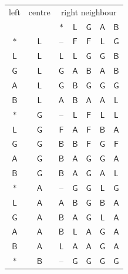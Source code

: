 \begin{table}[p]
\centering\small
\begin{tabular}{@{}cc|ccccc@{}}
\toprule
left & centre & \multicolumn{5}{c}{right neighbour}\\
 & & $\ast$ & $\mathsf{L}$ & $\mathsf{G}$ & $\mathsf{A}$ & $\mathsf{B}$\\
\midrule
$\ast$ & $\mathsf{L}$ & -- & $\mathsf{F}$ & $\mathsf{F}$ & $\mathsf{L}$ & $\mathsf{G}$\\
$\mathsf{L}$ & $\mathsf{L}$ & $\mathsf{L}$ & $\mathsf{L}$ & $\mathsf{G}$ & $\mathsf{G}$ & $\mathsf{B}$\\
$\mathsf{G}$ & $\mathsf{L}$ & $\mathsf{G}$ & $\mathsf{A}$ & $\mathsf{B}$ & $\mathsf{A}$ & $\mathsf{B}$\\
$\mathsf{A}$ & $\mathsf{L}$ & $\mathsf{G}$ & $\mathsf{B}$ & $\mathsf{G}$ & $\mathsf{G}$ & $\mathsf{G}$\\
$\mathsf{B}$ & $\mathsf{L}$ & $\mathsf{A}$ & $\mathsf{B}$ & $\mathsf{A}$ & $\mathsf{A}$ & $\mathsf{L}$\\
\midrule
$\ast$ & $\mathsf{G}$ & -- & $\mathsf{L}$ & $\mathsf{F}$ & $\mathsf{L}$ & $\mathsf{L}$\\
$\mathsf{L}$ & $\mathsf{G}$ & $\mathsf{F}$ & $\mathsf{A}$ & $\mathsf{F}$ & $\mathsf{B}$ & $\mathsf{A}$\\
$\mathsf{G}$ & $\mathsf{G}$ & $\mathsf{B}$ & $\mathsf{B}$ & $\mathsf{F}$ & $\mathsf{G}$ & $\mathsf{F}$\\
$\mathsf{A}$ & $\mathsf{G}$ & $\mathsf{B}$ & $\mathsf{A}$ & $\mathsf{G}$ & $\mathsf{G}$ & $\mathsf{A}$\\
$\mathsf{B}$ & $\mathsf{G}$ & $\mathsf{B}$ & $\mathsf{A}$ & $\mathsf{G}$ & $\mathsf{A}$ & $\mathsf{L}$\\
\midrule
$\ast$ & $\mathsf{A}$ & -- & $\mathsf{G}$ & $\mathsf{G}$ & $\mathsf{L}$ & $\mathsf{G}$\\
$\mathsf{L}$ & $\mathsf{A}$ & $\mathsf{A}$ & $\mathsf{B}$ & $\mathsf{G}$ & $\mathsf{B}$ & $\mathsf{A}$\\
$\mathsf{G}$ & $\mathsf{A}$ & $\mathsf{B}$ & $\mathsf{A}$ & $\mathsf{G}$ & $\mathsf{L}$ & $\mathsf{A}$\\
$\mathsf{A}$ & $\mathsf{A}$ & $\mathsf{B}$ & $\mathsf{L}$ & $\mathsf{A}$ & $\mathsf{G}$ & $\mathsf{A}$\\
$\mathsf{B}$ & $\mathsf{A}$ & $\mathsf{L}$ & $\mathsf{A}$ & $\mathsf{A}$ & $\mathsf{G}$ & $\mathsf{A}$\\
\midrule
$\ast$ & $\mathsf{B}$ & -- & $\mathsf{G}$ & $\mathsf{G}$ & $\mathsf{G}$ & $\mathsf{G}$\\

\end{tabular}
\end{table}
